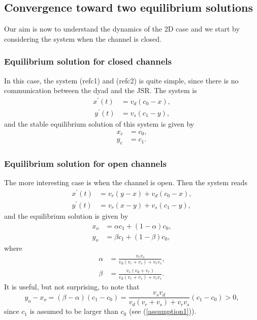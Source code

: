 \subsection{Convergence toward two equilibrium solutions}

Our aim is now to understand the dynamics of the 2D case and we start by
considering the system when the channel is closed.

\subsubsection{Equilibrium solution for closed channels}

In this case, the system (ref{c1}) and (ref{c2}) is quite simple, since
there is no communication between the dyad and the JSR. The system is
\begin{align}
x^{\prime}(t)  &  =v_{d}\left(  c_{0}-x\right)  \label{x_c},\\ \
y^{\prime}(t)  &  =v_{s}\left(  c_{1}-y\right)  \label{y_c},
\end{align}
and the stable equilibrium solution of this system is given by
\begin{align*}
x_{c}  &  =c_{0},\\
y_{c}  &  =c_{1}.
\end{align*}


\subsubsection{Equilibrium solution for open channels}

The more interesting case is when the channel is open. Then the system reads
\begin{align}
x^{\prime}(t)  &  =v_{r}\left(  y-x\right)  +v_{d}\left(  c_{0}-x\right) \label{x_o} ,\\
y^{\prime}(t)  &  =v_{r}\left(  x-y\right)  +v_{s}\left(  c_{1}-y\right) \label{y_o}, 
\end{align}
and the equilibrium solution is given by
\begin{align*}
x_{o}  &  =\alpha c_{1}+\left(  1-\alpha\right)  c_{0},\\
y_{o}  &  =\beta c_{1}+\left(  1-\beta\right)  c_{0},
\end{align*}
where
\begin{align*}
\alpha &  =\frac{v_{r}v_{s}}{v_{d}\left(  v_{r}+v_{s}\right)  +v_{r}v_{s}},\\
\beta &  =\frac{v_{s}\left(  v_{d}+v_{r}\right)  }{v_{d}\left(  v_{r}
+v_{s}\right)  +v_{r}v_{s}}.
\end{align*}
It is useful, but not surprising, to note that
\[
y_{o}-x_{o}=\left(  \beta-\alpha\right)  \left(  c_{1}-c_{0}\right)
=\frac{v_{s}v_{d}}{v_{d}\left(  v_{r}+v_{s}\right)  +v_{r}v_{s}}\left(
c_{1}-c_{0}\right)  >0,
\]
since $c_{1}$ is assumed to be larger than $c_{0}$ (see (\ref{assumption1})).


